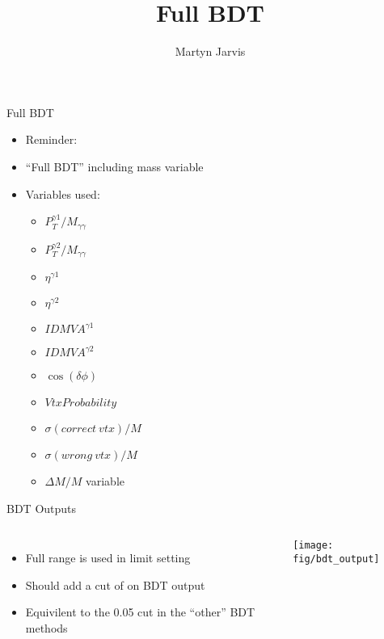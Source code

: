 \documentclass[t, 8pt]{beamer}
\author{Martyn Jarvis}
\title[Full BDT]{Full BDT}
\begin{document}


\begin{frame}{Full BDT}
  \begin{itemize}  
  \item Reminder:
  \item ``Full BDT'' including mass variable
  \item Variables used:
  \begin{itemize}  
    \item $P_T^{\gamma 1} / M_{\gamma \gamma}$
    \item $P_T^{\gamma 2} / M_{\gamma \gamma}$
    \item $\eta^{\gamma 1}$
    \item $\eta^{\gamma 2}$
    \item $ID MVA^{\gamma 1}$
    \item $ID MVA^{\gamma 2}$
    \item $\cos( \delta \phi )$
    \item $Vtx Probability$
    \item $\sigma(correct ~vtx)/M$
    \item $\sigma(wrong ~vtx)/M$
    \item \alert{$\Delta M/M$ variable}
  \end{itemize}
  \end{itemize}
\end{frame}

\begin{frame}{BDT Outputs}
  \begin{columns}[c]
  \begin{itemize}
    \item Full range is used in limit setting
    \item Should add a cut of on BDT output
    \item Equivilent to the 0.05 cut in the ``other'' BDT methods
  \end{itemize}
    \texttt{[image: fig/bdt\_output]}
  \end{columns}
\end{frame}
\end{document}
